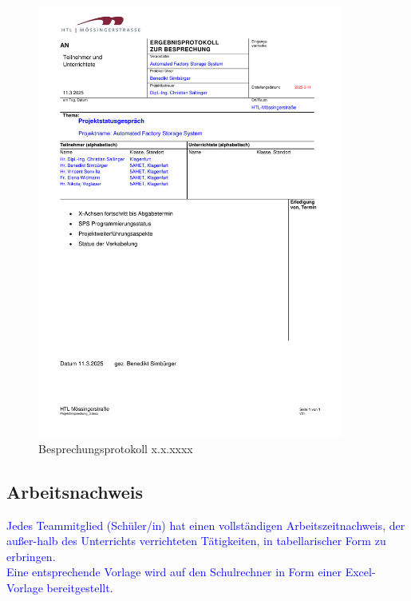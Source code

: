 \begin{figure}[H]
    \includegraphics[width=0.9\textwidth]{../Protokolls/Projektbesprechung_3.pdf}
    \centering
    \caption{Besprechungsprotokoll x.x.xxxx}
\end{figure}




\newpage
\subsection{Arbeitsnachweis}
\textcolor{blue}{Jedes Teammitglied (Schüler/in) hat einen vollständigen Arbeitszeitnachweis, der außer-halb des Unterrichts verrichteten Tätigkeiten, in tabellarischer Form zu erbringen. \\Eine entsprechende Vorlage wird auf den Schulrechner in Form einer Excel-Vorlage bereitgestellt.}

